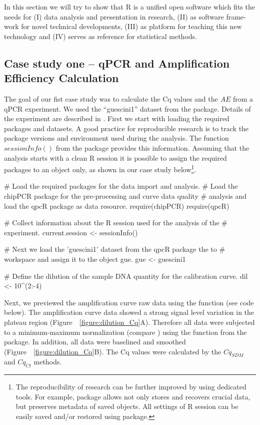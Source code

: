In this section we will try to show that R is a unified open software which 
fits 
the needs for (I) data analysis and presentation in research, (II) as software 
frame-work for novel technical developments, (III) as platform for teaching 
this 
new technology and (IV) serves as reference for statistical methods.

\subsection{Case study one -- qPCR and Amplification Efficiency Calculation}

The goal of our fist case study was to calculate the Cq values and the $AE$ 
from a qPCR experiment. We used the ``guescini1'' dataset from the 
 package. Details of the experiment are described in 
\citet{guescini_2008}. First we start with loading the required packages and 
datasets. A good practice for reproducible research is to track the package 
versions and environment used during the analysis. The function $sessionInfo()$ 
from the  package provides this information. Assuming that the 
analysis starts with a clean R session it is possible to assign the required 
packages to an object only, as shown in our case study below\footnote{The 
reproducibility of research can be further improved by using dedicated tools. 
For example,  package allows not only stores and recovers 
crucial data, but preserves metadata of saved objects. All settings of R session 
can be easily saved and/or restored using  package.}.

\begin{example}
# Load the required packages for the data import and analysis.
# Load the chipPCR package for the pre-processing and curve data quality
# analysis and load the qpcR package as data resource.
require(chipPCR)
require(qpcR)

# Collect information about the R session used for the analysis of the
# experiment.
current.session <- sessionInfo()

# Next we load the 'guescini1' dataset from the qpcR package the to
# workspace and assign it to the object gue.
gue <- guescini1

# Define the dilution of the sample DNA quantity for the calibration curve.
dil <- 10^(2:-4)
\end{example}

Next, we previewed the amplification curve raw data using the  
function (see code below). The amplification curve data showed a strong signal 
level variation in the plateau region (Figure~~\ref{figure:dilution_Cq}A). 
Therefore all data were subjected to a minimum-maximum normalization (compare 
\citet{roediger_RJ_2013}) using the  function from the 
 package. In addition, all data were baselined and smoothed 
(Figure~~\ref{figure:dilution_Cq}B). The Cq values were calculated by the 
$Cq_{SDM}$ and $Cq_{Ct}$ methods.

